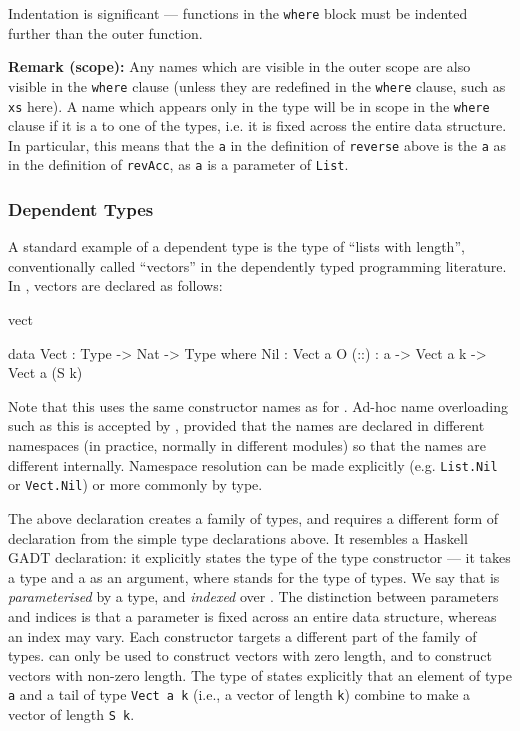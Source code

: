 \noindent
Indentation is significant --- functions in the \texttt{where} block must be indented
further than the outer function.

\textbf{Remark (scope):} 
Any names which are visible in the outer scope are also visible in the
\texttt{where} clause (unless they are redefined in the \texttt{where} clause,
such as \texttt{xs} here). A name which appears only in the type will be in
scope in the \texttt{where} clause if it is a  to one of the
types, i.e. it is fixed across the entire data structure.  In particular, this means
that the \texttt{a} in the definition of \texttt{reverse} above is the
 \texttt{a} as in the definition of \texttt{revAcc}, as \texttt{a}
is a parameter of \texttt{List}.

\subsubsection{Dependent Types}

A standard example of a dependent type is the type of ``lists with length'',
conventionally called ``vectors'' in the dependently typed programming
literature. In \Idris{}, vectors are declared as follows:

\begin{SaveVerbatim}{vect}

data Vect : Type -> Nat -> Type where
   Nil  : Vect a O
   (::) : a -> Vect a k -> Vect a (S k)

\end{SaveVerbatim}

\noindent
Note that this uses the same constructor names as for . Ad-hoc name
overloading such as this is accepted by \Idris{}, provided that the names are
declared in different namespaces (in practice, normally in different modules)
so that the names are different internally. Namespace resolution can be made
explicitly (e.g. \texttt{List.Nil} or \texttt{Vect.Nil}) or more commonly
by type.

The above declaration creates a family of types, and requires a different form
of declaration from the simple type declarations above. It resembles a Haskell
GADT declaration: it explicitly states the type
of the type constructor  --- it takes a type and a  as an
argument, where  stands for the type of types. We say that 
is \emph{parameterised} by a type, and \emph{indexed} over . 
The distinction between parameters and indices is that a parameter is fixed
across an entire data structure, whereas an index may vary.
Each constructor targets a different part of the family of types.  can
only be used to construct vectors with zero length, and \tDC{::} to construct
vectors with non-zero length. The type of \tDC{::} states explicitly that an element
of type \texttt{a} and a tail of type \texttt{Vect a k} (i.e., a vector of length \texttt{k})
combine to make a vector of length \texttt{S k}.

